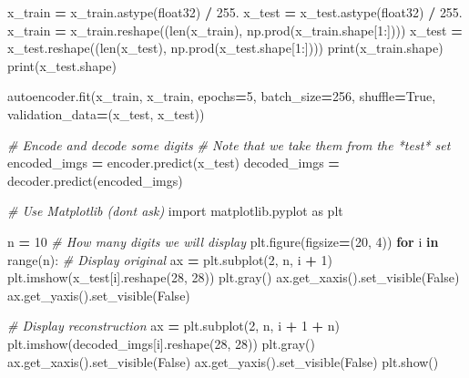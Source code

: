 \documentclass[
  a4paper,
  DIV=11,
  numbers=noendperiod]{scrreprt}
\newenvironment{Shaded}{\begin{snugshade}}{\end{snugshade}}
\newcommand{\BuiltInTok}[1]{#1}
\newcommand{\CommentTok}[1]{\textcolor[rgb]{0.56,0.35,0.01}{\textit{#1}}}
\newcommand{\ControlFlowTok}[1]{\textcolor[rgb]{0.13,0.29,0.53}{\textbf{#1}}}
\newcommand{\DecValTok}[1]{\textcolor[rgb]{0.00,0.00,0.81}{#1}}
\newcommand{\FloatTok}[1]{\textcolor[rgb]{0.00,0.00,0.81}{#1}}
\newcommand{\ImportTok}[1]{#1}
\newcommand{\KeywordTok}[1]{\textcolor[rgb]{0.13,0.29,0.53}{\textbf{#1}}}
\newcommand{\NormalTok}[1]{#1}
\newcommand{\OperatorTok}[1]{\textcolor[rgb]{0.81,0.36,0.00}{\textbf{#1}}}
\newcommand{\StringTok}[1]{\textcolor[rgb]{0.31,0.60,0.02}{#1}}
\newcommand{\VariableTok}[1]{\textcolor[rgb]{0.00,0.00,0.00}{#1}}
\begin{document}
\begin{Shaded}
\begin{Highlighting}[numbers=left,,]
\NormalTok{x\_train }\OperatorTok{=}\NormalTok{ x\_train.astype(}\StringTok{\textquotesingle{}float32\textquotesingle{}}\NormalTok{) }\OperatorTok{/} \FloatTok{255.}
\NormalTok{x\_test }\OperatorTok{=}\NormalTok{ x\_test.astype(}\StringTok{\textquotesingle{}float32\textquotesingle{}}\NormalTok{) }\OperatorTok{/} \FloatTok{255.}
\NormalTok{x\_train }\OperatorTok{=}\NormalTok{ x\_train.reshape((}\BuiltInTok{len}\NormalTok{(x\_train), np.prod(x\_train.shape[}\DecValTok{1}\NormalTok{:])))}
\NormalTok{x\_test }\OperatorTok{=}\NormalTok{ x\_test.reshape((}\BuiltInTok{len}\NormalTok{(x\_test), np.prod(x\_test.shape[}\DecValTok{1}\NormalTok{:])))}
\BuiltInTok{print}\NormalTok{(x\_train.shape)}
\BuiltInTok{print}\NormalTok{(x\_test.shape)}

\NormalTok{autoencoder.fit(x\_train, x\_train,}
\NormalTok{                epochs}\OperatorTok{=}\DecValTok{5}\NormalTok{,}
\NormalTok{                batch\_size}\OperatorTok{=}\DecValTok{256}\NormalTok{,}
\NormalTok{                shuffle}\OperatorTok{=}\VariableTok{True}\NormalTok{,}
\NormalTok{                validation\_data}\OperatorTok{=}\NormalTok{(x\_test, x\_test))}

\CommentTok{\# Encode and decode some digits}
\CommentTok{\# Note that we take them from the *test* set}
\NormalTok{encoded\_imgs }\OperatorTok{=}\NormalTok{ encoder.predict(x\_test)}
\NormalTok{decoded\_imgs }\OperatorTok{=}\NormalTok{ decoder.predict(encoded\_imgs)}

\CommentTok{\# Use Matplotlib (don\textquotesingle{}t ask)}
\ImportTok{import}\NormalTok{ matplotlib.pyplot }\ImportTok{as}\NormalTok{ plt}

\NormalTok{n }\OperatorTok{=} \DecValTok{10}  \CommentTok{\# How many digits we will display}
\NormalTok{plt.figure(figsize}\OperatorTok{=}\NormalTok{(}\DecValTok{20}\NormalTok{, }\DecValTok{4}\NormalTok{))}
\ControlFlowTok{for}\NormalTok{ i }\KeywordTok{in} \BuiltInTok{range}\NormalTok{(n):}
    \CommentTok{\# Display original}
\NormalTok{    ax }\OperatorTok{=}\NormalTok{ plt.subplot(}\DecValTok{2}\NormalTok{, n, i }\OperatorTok{+} \DecValTok{1}\NormalTok{)}
\NormalTok{    plt.imshow(x\_test[i].reshape(}\DecValTok{28}\NormalTok{, }\DecValTok{28}\NormalTok{))}
\NormalTok{    plt.gray()}
\NormalTok{    ax.get\_xaxis().set\_visible(}\VariableTok{False}\NormalTok{)}
\NormalTok{    ax.get\_yaxis().set\_visible(}\VariableTok{False}\NormalTok{)}

    \CommentTok{\# Display reconstruction}
\NormalTok{    ax }\OperatorTok{=}\NormalTok{ plt.subplot(}\DecValTok{2}\NormalTok{, n, i }\OperatorTok{+} \DecValTok{1} \OperatorTok{+}\NormalTok{ n)}
\NormalTok{    plt.imshow(decoded\_imgs[i].reshape(}\DecValTok{28}\NormalTok{, }\DecValTok{28}\NormalTok{))}
\NormalTok{    plt.gray()}
\NormalTok{    ax.get\_xaxis().set\_visible(}\VariableTok{False}\NormalTok{)}
\NormalTok{    ax.get\_yaxis().set\_visible(}\VariableTok{False}\NormalTok{)}
\NormalTok{plt.show()}

\end{Highlighting}
\end{Shaded}
\end{document}
